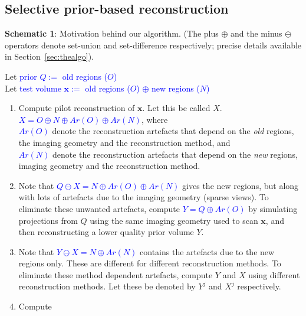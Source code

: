 \documentclass[journal]{IEEEtran}
\begin{document}
\subsection{\textbf{Selective prior-based reconstruction}}
\label{sec:selective_prior}
\vspace{1mm}
\noindent \begin{boxedminipage}{0.5\textwidth} 
{\bf Schematic 1}: Motivation behind our algorithm. (The plus $\oplus$ and the
minus $\ominus$ operators denote set-union and set-difference respectively; precise details available
in Section~\ref{sec:thealgo}). 

{\small
 Let \textcolor{blue}{prior $Q:=$ old regions ($O$)}\\
 Let \textcolor{blue}{test volume $\boldsymbol{x}:=$ old regions ($O$) $\oplus$ new regions ($N$)}\\
    \begin{enumerate}
\item  Compute pilot reconstruction of $\boldsymbol{x}$. Let this be called $X$.\\ \textcolor{blue}{$X = O \oplus N \oplus Ar(O) \oplus Ar(N)$}, where \\ \textcolor{blue}{$Ar(O)$} denote the reconstruction artefacts that depend on the \textit{old} regions, the imaging geometry and the reconstruction method, and\\
 \textcolor{blue}{$Ar(N)$} denote the reconstruction artefacts that depend on the \textit{new} regions, imaging geometry and the reconstruction method.
\item  Note that \textcolor{blue}{$Q \ominus X = N \oplus Ar(O) \oplus Ar(N)$} gives the new regions, but along with lots of artefacts due to the imaging geometry (sparse views). To eliminate these unwanted artefacts, compute \textcolor{blue}{$Y = Q \oplus Ar(O)$} by simulating projections from $Q$ using the same imaging geometry used to scan $\boldsymbol{x}$, and then reconstructing a lower quality prior volume $Y$. 
    \item Note that \textcolor{blue}{$Y \ominus X = N \oplus Ar(N)$} contains the artefacts due to the new regions only. These are different for different reconstruction methods. To eliminate these method dependent artefacts, compute $Y$ and $X$ using different reconstruction methods. Let these be denoted by $Y^j$ and $X^j$ respectively.
    \item Compute
\vspace{-0.2cm}

\end{enumerate}}
\end{boxedminipage}
\end{document}
